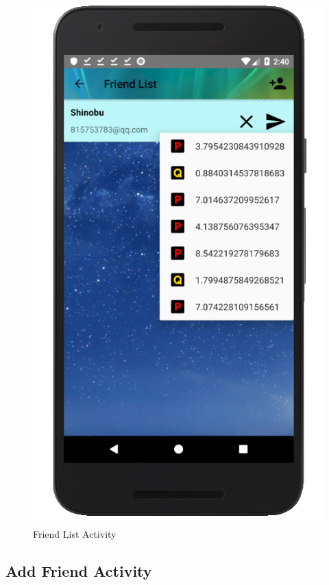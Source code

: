 \documentclass[12pt]{article}
\begin{document}
\begin{figure}
	\includegraphics[scale=0.25]{FriendCoin.png}
	\caption{\label{fig:friend}Friend List Activity}
\end{figure}

\subsection{Add Friend Activity}
\end{document}
